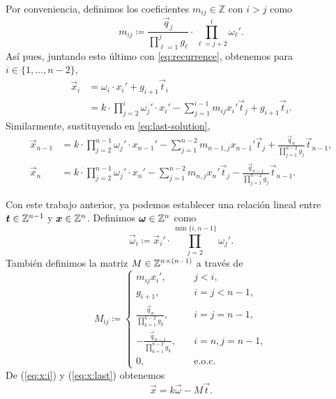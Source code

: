 Por conveniencia, definimos los coeficientes $m_{ij} \in \mathbb{Z}$ con $i > j$ como
\begin{equation}
	\label{phase-2:eq:coeffs}
	m_{ij} \coloneq \frac{\vec{q}_j}{\prod_{\ell = 1}^{j}g_\ell} \cdot \prod_{\ell = j +
	2}^{i}\omega_\ell'.
\end{equation}
Así pues, juntando esto último con \ref{eq:recurrence}, obtenemos para $i \in \{1, \ldots, n -
2\}$, 
\begin{align}
	\vec{x}_i &= \omega_i \cdot x_i' + g_{i + 1}\vec{t}_i \nonumber \\
		&= k \cdot \prod_{j=2}^{i}\omega_j' \cdot x_i' - \sum_{j=1}^{i - 1}m_{ij}x_i'
		\vec{t}_j + g_{i + 1}\vec{t}_i \label{eq:x:i}.
\end{align}
Similarmente, sustituyendo en \ref{eq:last-solution},
\begin{subequations}
	\label{eq:x:last}
	\begin{align}
		\vec{x}_{n-1} &= k \cdot \prod_{j=2}^{n-1} \omega_j' \cdot x_{n-1}' - \sum_{j=1}^{n-2}
		m_{n-1,j}x_{n-1}' \vec{t}_j + \frac{\vec{q}_n}{\prod_{j=1}^{n-2}g_j} \vec{t}_{n-1}, \\
		\vec{x}_{n} &= k \cdot \prod_{j=2}^{n-1} \omega_j' \cdot x_{n}' - \sum_{j=1}^{n-2}
		m_{n,j}x_{n}' \vec{t}_j - \frac{\vec{q}_{n - 1}}{\prod_{j=1}^{n-2}g_j} \vec{t}_{n-1}.
	\end{align}
\end{subequations}

Con este trabajo anterior, ya podemos establecer una relación lineal entre $\boldsymbol{t} \in \mathbb{Z}^{n-1}$ y
$\boldsymbol{x} \in \mathbb{Z}^n$. Definimos $\boldsymbol{\omega} \in \mathbb{Z}^n$ como
\begin{equation}
	\label{eq:vec-omega}
	\vec{\omega}_i \coloneq \vec{x}_i' \cdot \prod_{j = 2}^{\min{\lbrace i, n - 1 \rbrace}}\omega_j'.
\end{equation}
También definimos la matriz $M \in \mathbb{Z}^{n \times (n - 1)}$ a través de
\begin{equation}
	\label{eq:mat-T}
	M_{ij} \coloneq \begin{cases}
		m_{ij}x_i', &\quad j < i, \\
		g_{i + 1},  &\quad i = j < n - 1, \\
		\frac{\vec{q}_n}{\prod_{k=1}^{n-2}g_k}, &\quad i = j = n - 1, \\
		-\frac{\vec{q}_{n-1}}{\prod_{k=1}^{n-2}g_k}, &\quad i = n, j = n - 1, \\
		0, &\quad \text{e.o.c.}
	\end{cases}
\end{equation}
De (\ref{eq:x:i}) y (\ref{eq:x:last}) obtenemos
\begin{equation}
	\label{eq:transf}
	\vec{x} = k\vec{\omega} - M\vec{t}.
\end{equation}

